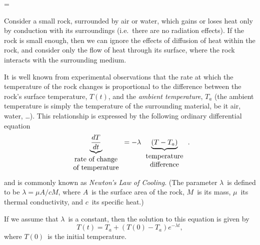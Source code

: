 \documentclass{article}
\makeatletter
\let\realnormalsize=\normalsize
\def\liih@math{\ifmmode$\else\bad@math\fi}
\def\adjustnormalsize{\def\normalsize{\mathsurround=0pt \realnormalsize
 \parindent=0pt\abovedisplayskip=0pt\belowdisplayskip=0pt}%
 \def\phantompar{\csname par\endcsname}\normalsize}%
\newcommand\lthtmlvboxmathA{\adjustnormalsize\setbox\sizebox=\vbox\bgroup %
 \let\ifinner=\iffalse \let\)\liih@math }%
\newcommand\lthtmlmathtype[1]{\gdef\lthtmlmathenv{#1}}%
\newcommand\lthtmlfigureA[1]{\let\@savefreelist\@freelist
       \lthtmlmathtype{#1}\lthtmlvboxmathA}%
\makeatother
\begin{document}
{\newpage\clearpage
\lthtmlfigureA{example188}%
\begin{example}
  Consider a small rock, surrounded by air or water, which gains or
  loses heat only by conduction with its surroundings 
  (i.e.~there are no radiation effects).
  If the rock is small enough, then we can ignore the effects of
  diffusion of heat within the rock, and consider only the flow of heat
  through its surface, where the rock interacts with the surrounding
  medium.  
\par It is well known from experimental observations that the 
  rate at which the temperature of the rock changes
  is proportional to 
  the difference between the rock's surface temperature, $T(t)$, 
    and the \emph{ambient temperature}, $T_a$  (the ambient temperature is
  simply the temperature of the surrounding material, be it air,
  water, \dots).
  This relationship is expressed by the following ordinary
  differential equation
  \begin{equation}
\underbrace{\frac{dT}{dt}}_{\begin{array}{c} 
                                \mbox{\rm rate of change}\\
                                \mbox{\rm of temperature}
                                \end{array}}
    = -\lambda \underbrace{(T-T_a)}_{\begin{array}{c} 
                                \mbox{\rm temperature}\\
                                \mbox{\rm difference}
                                \end{array}} .
  \end{equation}
  and is commonly known as \emph{Newton's Law of Cooling}.
  (The parameter $\lambda$\  is defined to be $\lambda = \mu A/cM$, where
  $A$\  is the surface area of the rock, 
  $M$\  is its mass, $\mu$\  its thermal conductivity, and $c$\  its
  specific heat.)
\par{} 
\par If we assume that $\lambda$\  is a constant, then the solution to this
  equation is given by 
  \begin{equation}
    T(t) = T_a + (T(0)-T_a)e^{-\lambda t},
  \end{equation}
  where $T(0)$\  is the initial temperature.  
\par{}
\end{example}}
\end{document}
